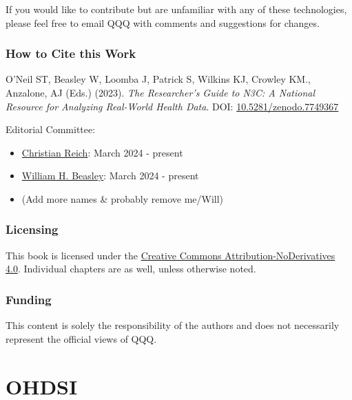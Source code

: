 \documentclass[
  letterpaper,
  paper=7in:10in,
  pagesize=pdftex,
  headinclude=on,
  footinclude=on,
  12pt]{scrbook}
\providecommand{\tightlist}{%
  \setlength{\itemsep}{0pt}\setlength{\parskip}{0pt}}\usepackage{longtable,booktabs,array}
\begin{document}
If you would like to contribute but are unfamiliar with any of these
technologies, please feel free to email QQQ with comments and
suggestions for changes.

\section*{How to Cite this Work}\label{sec-welcome-cite}


O'Neil ST, Beasley W, Loomba J, Patrick S, Wilkins KJ, Crowley KM.,
Anzalone, AJ (Eds.) (2023). \emph{The Researcher's Guide to N3C: A
National Resource for Analyzing Real-World Health Data}. DOI:
\href{https://zenodo.org/record/7749367\#.ZEgPD3bMJmM}{10.5281/zenodo.7749367}

Editorial Committee:

\begin{itemize}
\tightlist
\item
  \href{https://orcid.org/0000-0002-3641-055X}{Christian Reich}: March
  2024 - present
\item
  \href{https://orcid.org/0000-0002-5613-5006}{William H. Beasley}:
  March 2024 - present
\item
  (Add more names \& probably remove me/Will)
\end{itemize}

\section*{Licensing}\label{sec-welcome-licensing}


This book is licensed under the
\href{https://creativecommons.org/licenses/by-nd/4.0/}{Creative Commons
Attribution-NoDerivatives 4.0}. Individual chapters are as well, unless
otherwise noted.

\section*{Funding}\label{sec-welcome-funding}


This content is solely the responsibility of the authors and does not
necessarily represent the official views of QQQ.

\part{OHDSI}
\end{document}
